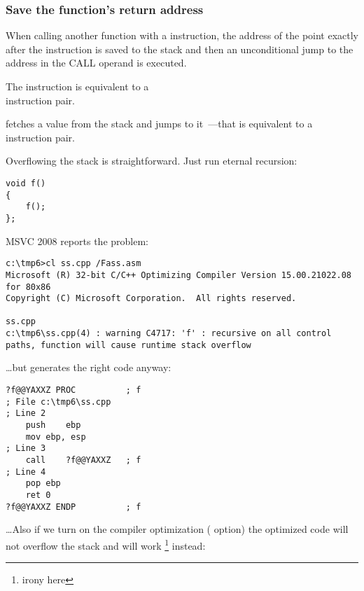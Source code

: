 \subsubsection{Save the function's return address}


When calling another function with a \CALL instruction, the address of the point exactly after the \CALL instruction is saved 
to the stack and then an unconditional jump to the address in the CALL operand is executed.

The \CALL instruction is equivalent to a\\
 instruction pair.

\RET fetches a value from the stack and jumps to it~---that is equivalent to a  instruction pair.

\myindex{\Recursion}
Overflowing the stack is straightforward. Just run eternal recursion:

\begin{lstlisting}
void f()
{
	f();
};
\end{lstlisting}

MSVC 2008 reports the problem:

\begin{lstlisting}
c:\tmp6>cl ss.cpp /Fass.asm
Microsoft (R) 32-bit C/C++ Optimizing Compiler Version 15.00.21022.08 for 80x86
Copyright (C) Microsoft Corporation.  All rights reserved.

ss.cpp
c:\tmp6\ss.cpp(4) : warning C4717: 'f' : recursive on all control paths, function will cause runtime stack overflow
\end{lstlisting}

\dots but generates the right code anyway:

\begin{lstlisting}
?f@@YAXXZ PROC			; f
; File c:\tmp6\ss.cpp
; Line 2
	push	ebp
	mov	ebp, esp
; Line 3
	call	?f@@YAXXZ	; f
; Line 4
	pop	ebp
	ret	0
?f@@YAXXZ ENDP			; f
\end{lstlisting}

\dots Also if we turn on the compiler optimization (\TT{\Ox} option) the optimized code will not overflow the stack 
and will work \footnote{irony here} instead:

